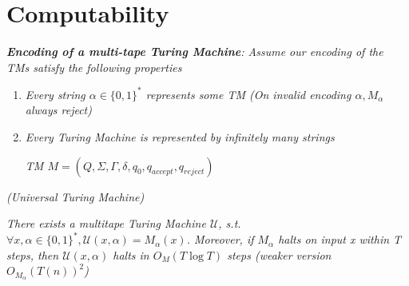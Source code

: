 \documentclass{article}
\begin{document}
\setcounter{section}{3}
\else
\fi
\section{Computability}

\textit{\textbf{Encoding of a multi-tape Turing Machine}: Assume our encoding of the TMs satisfy the following properties}

\begin{enumerate}
    \item \textit{Every string $\alpha\in\{0,1\}^*$ represents some TM (On invalid encoding $\alpha,M_{\alpha}$ always reject)}
    \item \textit{Every Turing Machine is represented by infinitely many strings}

    \textit{TM $M = (Q,\Sigma,\varGamma,\delta,q_0,q_{accept},q_{reject})$}
\end{enumerate}

\begin{thm}
    \textit{(Universal Turing Machine)}

    \textit{There exists a multitape Turing Machine $\mathcal{U}$, s.t. $\forall x,\alpha\in\{0,1\}^*,\mathcal{U}(x,\alpha) = M_\alpha(x)$. Moreover, if $M_\alpha$ halts on input x within T steps, then $\mathcal{U}(x,\alpha)$ halts in $O_M(T\log T)$ steps (weaker version $O_{M_\alpha}(T(n))^2$)}




        
\end{thm}    
\end{document}
